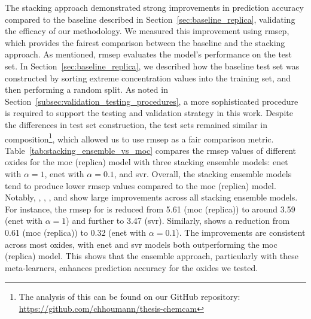 The stacking approach demonstrated strong improvements in prediction accuracy compared to the baseline described in Section~\ref{sec:baseline_replica}, validating the efficacy of our methodology.
We measured this improvement using \gls{rmsep}, which provides the fairest comparison between the baseline and the stacking approach.
As mentioned, \gls{rmsep} evaluates the model's performance on the test set.
In Section~\ref{sec:baseline_replica}, we described how the baseline test set was constructed by sorting extreme concentration values into the training set, and then performing a random split.
As noted in Section~\ref{subsec:validation_testing_procedures}, a more sophisticated procedure is required to support the testing and validation strategy in this work.
Despite the differences in test set construction, the test sets remained similar in composition\footnote{The analysis of this can be found on our GitHub repository: \url{https://github.com/chhoumann/thesis-chemcam}}, which allowed us to use \gls{rmsep} as a fair comparison metric.
Table~\ref{tab:stacking_ensemble_vs_moc} compares the \gls{rmsep} values of different oxides for the \gls{moc} (replica) model with three stacking ensemble models: \gls{enet} with $\alpha = 1$, \gls{enet} with $\alpha = 0.1$, and \gls{svr}.
Overall, the stacking ensemble models tend to produce lower \gls{rmsep} values compared to the \gls{moc} (replica) model.
Notably, , , , and  show large improvements across all stacking ensemble models.
For instance, the \gls{rmsep} for  is reduced from 5.61 (\gls{moc} (replica)) to around 3.59 (\gls{enet} with $\alpha = 1$) and further to 3.47 (\gls{svr}).
Similarly,  shows a reduction from 0.61 (\gls{moc} (replica)) to 0.32 (\gls{enet} with $\alpha = 0.1$).
The improvements are consistent across most oxides, with \gls{enet} and \gls{svr} models both outperforming the \gls{moc} (replica) model.
This shows that the ensemble approach, particularly with these meta-learners, enhances prediction accuracy for the oxides we tested.

